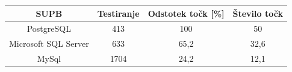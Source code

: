 \documentclass[a4paper,11pt]{report}
\begin{document}
\begin{center}
   \begin{tabular}{||c|c|c|c||}
      \hline
      \textbf{SUPB} & \textbf{Testiranje} & \textbf{Odstotek točk [\%]} & \textbf{Število točk}\\
      \hline
      \hline
      PostgreSQL & 413 & 100 & 50\\
      Microsoft SQL Server & 633 & 65,2 & 32,6 \\
      MySql & 1704 & 24,2 & 12,1 \\
      \hline
   \end{tabular}
\end{center}
\end{document}
